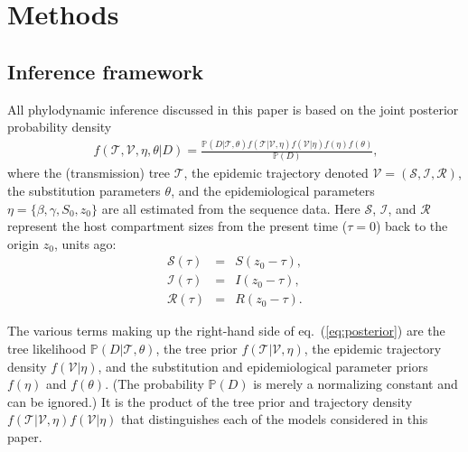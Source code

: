 \documentclass[12pt,titlepage]{article}
\newcommand{\St}{\mathcal{S}}
\newcommand{\It}{\mathcal{I}}
\newcommand{\Rt}{\mathcal{R}}
\newcommand{\traj}{\mathcal{V}}
\newcommand{\tree}{\mathcal{T}}
\begin{document}


\section{Methods}

\subsection{Inference framework}





All phylodynamic inference discussed in this paper is based on the joint posterior probability density
\begin{eqnarray}
\ f(\tree,\traj,\eta, \theta | D) = \frac{\mathbb{P} (D|\tree,\theta) f(\tree|\traj,\eta) f(\traj |\eta) f(\eta) f(\theta) }{\mathbb{P}(D)},
\label{eq:posterior}
\end{eqnarray}
where the (transmission) tree $\tree$, the epidemic trajectory denoted $\traj = \left( \St,\It,\Rt \right)$, the substitution parameters $\theta$, and the epidemiological parameters $\eta = \{\beta,\gamma,S_0,z_0\}$ are all estimated from the sequence data.  
Here $\St$, $\It$, and $\Rt$ represent the host compartment sizes from the present time ($\tau=0$) back to the origin $z_{0}$, units ago:
\begin{eqnarray}
\St(\tau) &=& S(z_{0}-\tau), \\
\It(\tau) &=& I(z_{0}-\tau), \\
\Rt(\tau) &=& R(z_{0}-\tau).  
\end{eqnarray}

The various terms making up the right-hand side of
eq.~(\ref{eq:posterior}) are the tree likelihood
$\mathbb{P}(D|\tree,\theta)$, the tree prior $f(\tree|\traj,\eta)$,
the epidemic trajectory density $f(\traj|\eta)$, and the substitution
and epidemiological parameter priors $f(\eta)$ and $f(\theta)$. (The
probability $\mathbb{P}(D)$ is merely a normalizing constant and can
be ignored.)  It is the product of the tree prior and trajectory
density $f(\tree|\traj,\eta)f(\traj|\eta)$ that distinguishes each of
the models considered in this paper.
\end{document}
